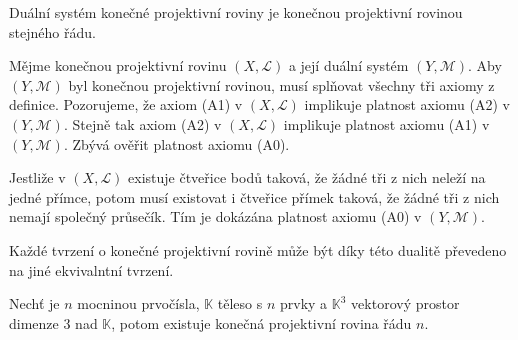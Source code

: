 \begin{t_theorem}
  Duální systém konečné projektivní roviny je konečnou projektivní rovinou stejného řádu.
\end{t_theorem}

\begin{t_proof}
  Mějme konečnou projektivní rovinu $(X,\mathcal{L})$ a její duální systém $(Y,\mathcal{M})$. Aby $(Y,\mathcal{M})$ byl konečnou projektivní rovinou, musí splňovat všechny tři axiomy z definice. Pozorujeme, že axiom (A1) v $(X,\mathcal{L})$ implikuje platnost axiomu (A2) v $(Y,\mathcal{M})$. Stejně tak axiom (A2) v $(X,\mathcal{L})$ implikuje platnost axiomu (A1) v $(Y,\mathcal{M})$. Zbývá ověřit platnost axiomu (A0).
  
  Jestliže v $(X,\mathcal{L})$ existuje čtveřice bodů taková, že žádné tři z nich neleží na jedné přímce, potom musí existovat i čtveřice přímek taková, že žádné tři z nich nemají společný průsečík. Tím je dokázána platnost axiomu (A0) v $(Y,\mathcal{M})$.
\end{t_proof}

\begin{t_corollary}
  Každé tvrzení o konečné projektivní rovině může být díky této dualitě převedeno na jiné ekvivalntní tvrzení.
\end{t_corollary}

\begin{t_theorem}
  Nechť je $n$ mocninou prvočísla, $\mathbb{K}$ těleso s $n$ prvky a $\mathbb{K}^3$ vektorový prostor dimenze 3 nad $\mathbb{K}$, potom existuje konečná projektivní rovina řádu $n$.
\end{t_theorem}

